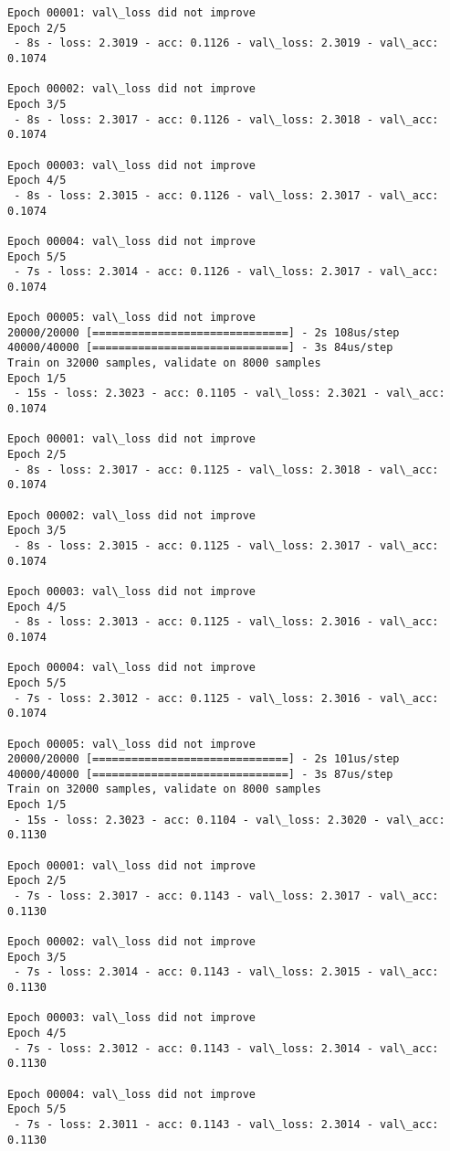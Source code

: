 \documentclass[11pt]{article}
\begin{document}
\begin{Verbatim}[commandchars=\\\{\}]
Epoch 00001: val\_loss did not improve
Epoch 2/5
 - 8s - loss: 2.3019 - acc: 0.1126 - val\_loss: 2.3019 - val\_acc: 0.1074

Epoch 00002: val\_loss did not improve
Epoch 3/5
 - 8s - loss: 2.3017 - acc: 0.1126 - val\_loss: 2.3018 - val\_acc: 0.1074

Epoch 00003: val\_loss did not improve
Epoch 4/5
 - 8s - loss: 2.3015 - acc: 0.1126 - val\_loss: 2.3017 - val\_acc: 0.1074

Epoch 00004: val\_loss did not improve
Epoch 5/5
 - 7s - loss: 2.3014 - acc: 0.1126 - val\_loss: 2.3017 - val\_acc: 0.1074

Epoch 00005: val\_loss did not improve
20000/20000 [==============================] - 2s 108us/step
40000/40000 [==============================] - 3s 84us/step
Train on 32000 samples, validate on 8000 samples
Epoch 1/5
 - 15s - loss: 2.3023 - acc: 0.1105 - val\_loss: 2.3021 - val\_acc: 0.1074

Epoch 00001: val\_loss did not improve
Epoch 2/5
 - 8s - loss: 2.3017 - acc: 0.1125 - val\_loss: 2.3018 - val\_acc: 0.1074

Epoch 00002: val\_loss did not improve
Epoch 3/5
 - 8s - loss: 2.3015 - acc: 0.1125 - val\_loss: 2.3017 - val\_acc: 0.1074

Epoch 00003: val\_loss did not improve
Epoch 4/5
 - 8s - loss: 2.3013 - acc: 0.1125 - val\_loss: 2.3016 - val\_acc: 0.1074

Epoch 00004: val\_loss did not improve
Epoch 5/5
 - 7s - loss: 2.3012 - acc: 0.1125 - val\_loss: 2.3016 - val\_acc: 0.1074

Epoch 00005: val\_loss did not improve
20000/20000 [==============================] - 2s 101us/step
40000/40000 [==============================] - 3s 87us/step
Train on 32000 samples, validate on 8000 samples
Epoch 1/5
 - 15s - loss: 2.3023 - acc: 0.1104 - val\_loss: 2.3020 - val\_acc: 0.1130

Epoch 00001: val\_loss did not improve
Epoch 2/5
 - 7s - loss: 2.3017 - acc: 0.1143 - val\_loss: 2.3017 - val\_acc: 0.1130

Epoch 00002: val\_loss did not improve
Epoch 3/5
 - 7s - loss: 2.3014 - acc: 0.1143 - val\_loss: 2.3015 - val\_acc: 0.1130

Epoch 00003: val\_loss did not improve
Epoch 4/5
 - 7s - loss: 2.3012 - acc: 0.1143 - val\_loss: 2.3014 - val\_acc: 0.1130

Epoch 00004: val\_loss did not improve
Epoch 5/5
 - 7s - loss: 2.3011 - acc: 0.1143 - val\_loss: 2.3014 - val\_acc: 0.1130


\end{Verbatim}
\end{document}
